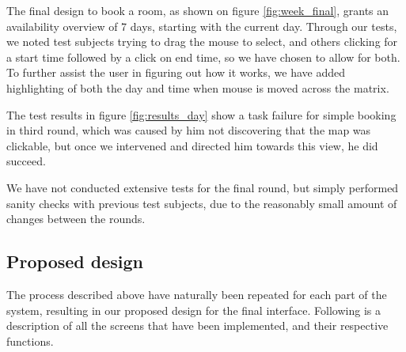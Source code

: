 The final design to book a room, as shown on figure \ref{fig:week_final}, grants an availability overview of 7 days, starting with the current day. Through our tests, we noted test subjects trying to drag the mouse to select, and others clicking for a start time followed by a click on end time, so we have chosen to allow for both.
To further assist the user in figuring out how it works, we have added highlighting of both the day and time when mouse is moved across the matrix.

The test results in figure \ref{fig:results_day} show a task failure for simple booking in third round, which was caused by him not discovering that the map was clickable, but once we intervened and directed him towards this view, he did succeed.

We have not conducted extensive tests for the final round, but simply performed sanity checks with previous test subjects, due to the reasonably small amount of changes between the rounds.


\pagebreak
\subsection{Proposed design}
\label{sec:proposed_design_dtd}
The process described above have naturally been repeated for each part of the system, resulting in our proposed design for the final interface.
Following is a description of all the screens that have been implemented, and their respective functions.


